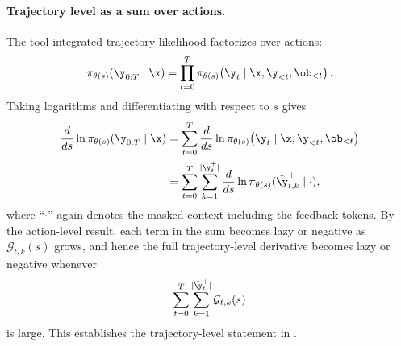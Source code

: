 \paragraph{Trajectory level as a sum over actions.}
The tool-integrated trajectory likelihood factorizes over actions:
\[
\pi_{\theta(s)}(\y_{0:T}\mid \x)
=
\prod_{t=0}^{T}
\pi_{\theta(s)}\!\left(\y_t \mid \x, \y_{<t}, \ob_{<t}\right).
\]
Taking logarithms and differentiating with respect to $s$ gives
\begin{align*}
\frac{d}{ds}
\ln \pi_{\theta(s)}(\y_{0:T}\mid \x)
&=
\sum_{t=0}^{T}
\frac{d}{ds}
\ln \pi_{\theta(s)}\!\left(\y_t \mid \x, \y_{<t}, \ob_{<t}\right) \\
&=
\sum_{t=0}^{T}
\sum_{k=1}^{|\hat{\y}_t^+|}
\frac{d}{ds}
\ln \pi_{\theta(s)}(\hat{\y}^+_{t,k}\mid \cdot),
\end{align*}
where “$\cdot$” again denotes the masked context including the feedback tokens.
By the action-level result, each term in the sum becomes lazy or negative as
$\mathcal{G}_{t,k}(s)$ grows, and hence the full trajectory-level derivative becomes lazy or
negative whenever
\[
\sum_{t=0}^{T}
\sum_{k=1}^{|\hat{\y}_t^+|}
\mathcal{G}_{t,k}(s)
\]
is large. This establishes the trajectory-level statement in .


